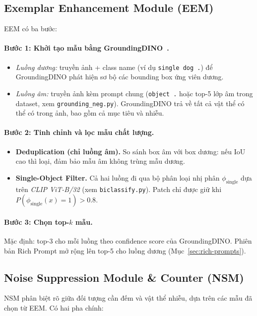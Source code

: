 \documentclass[a4paper,12pt]{report}
\numberwithin{figure}{chapter}
\numberwithin{table}{chapter}
\begin{document}
\subsection{Exemplar Enhancement Module (EEM)}
\label{subsec:eem}
EEM có ba bước:

\paragraph{Bước 1: Khởi tạo mẫu bằng GroundingDINO~\cite{groundingdino}.}
\begin{itemize}
    \item \textit{Luồng dương:} truyền ảnh + class name (ví dụ \texttt{single dog .}) để GroundingDINO phát hiện sơ bộ các bounding box ứng viên dương.
    \item \textit{Luồng âm:} truyền ảnh kèm prompt chung (\texttt{object .} hoặc top-5 lớp âm trong dataset, xem \texttt{grounding\_neg.py}). GroundingDINO trả về tất cả vật thể có thể có trong ảnh, bao gồm cả mục tiêu và nhiễu.
\end{itemize}

\paragraph{Bước 2: Tinh chỉnh và lọc mẫu chất lượng.}
\begin{itemize}
    \item \textbf{Deduplication (chỉ luồng âm).} So sánh box âm với box dương: nếu IoU cao thì loại, đảm bảo mẫu âm không trùng mẫu dương.
    \item \textbf{Single-Object Filter.} Cả hai luồng đi qua bộ phân loại nhị phân $\phi_{\text{single}}$ dựa trên \textit{CLIP ViT-B/32} (xem \texttt{biclassify.py}). Patch chỉ được giữ khi $P(\phi_{\text{single}}(x)=1) > 0.8$.
\end{itemize}

\paragraph{Bước 3: Chọn top-$k$ mẫu.} Mặc định: top-3 cho mỗi luồng theo confidence score của GroundingDINO. Phiên bản Rich Prompt mở rộng lên top-5 cho luồng dương (Mục~\ref{sec:rich-prompts}).

\subsection{Noise Suppression Module \& Counter (NSM)}
\label{subsec:nsm}
NSM phân biệt rõ giữa đối tượng cần đếm và vật thể nhiễu, dựa trên các mẫu đã chọn từ EEM. Có hai pha chính:
\end{document}
